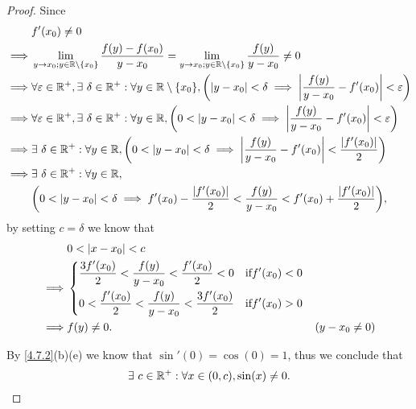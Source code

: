 \begin{proof}
  Since
  \begin{align*}
             & f'(x_0) \neq 0                                                                                                                                                                               \\
    \implies & \lim_{y \to x_0 ; y \in \R \setminus \{x_0\}} \dfrac{f(y) - f(x_0)}{y - x_0} = \lim_{y \to x_0 ; y \in \R \setminus \{x_0\}} \dfrac{f(y)}{y - x_0} \neq 0                                    \\
    \implies & \forall \varepsilon \in \R^+, \exists\ \delta \in \R^+ : \forall y \in \R \setminus \{x_0\}, \bigg(\abs{y - x_0} < \delta \implies \abs{\dfrac{f(y)}{y - x_0} - f'(x_0)} < \varepsilon\bigg) \\
    \implies & \forall \varepsilon \in \R^+, \exists\ \delta \in \R^+ : \forall y \in \R, \bigg(0 < \abs{y - x_0} < \delta \implies \abs{\dfrac{f(y)}{y - x_0} - f'(x_0)} < \varepsilon\bigg)               \\
    \implies & \exists\ \delta \in \R^+ : \forall y \in \R, \bigg(0 < \abs{y - x_0} < \delta \implies \abs{\dfrac{f(y)}{y - x_0} - f'(x_0)} < \dfrac{\abs{f'(x_0)}}{2}\bigg)                                \\
    \implies & \exists\ \delta \in \R^+ : \forall y \in \R,                                                                                                                                                 \\
             & \bigg(0 < \abs{y - x_0} < \delta \implies f'(x_0) - \dfrac{\abs{f'(x_0)}}{2} < \dfrac{f(y)}{y - x_0} < f'(x_0) + \dfrac{\abs{f'(x_0)}}{2}\bigg),
  \end{align*}
  by setting \(c = \delta\) we know that
  \begin{align*}
             & 0 < \left\lvert x - x_0\right\rvert < c                                                                                               \\
    \implies & \begin{dcases}
                 \dfrac{3 f'(x_0)}{2} < \dfrac{f(y)}{y - x_0} < \dfrac{f'(x_0)}{2} < 0 & \text{if} f'(x_0) < 0 \\
                 0 < \dfrac{f'(x_0)}{2} < \dfrac{f(y)}{y - x_0} < \dfrac{3 f'(x_0)}{2} & \text{if} f'(x_0) > 0
               \end{dcases}                       \\
    \implies & f(y) \neq 0.                                                                                     & (y - x_0 \neq 0)
  \end{align*}

  By \cref{4.7.2}(b)(e) we know that \(\sin'(0) = \cos(0) = 1\), thus we conclude that
  \[
    \exists\ c \in \mathbb{R}^+ : \forall x \in (0, c), \sin(x) \neq 0.
  \]
\end{proof}

